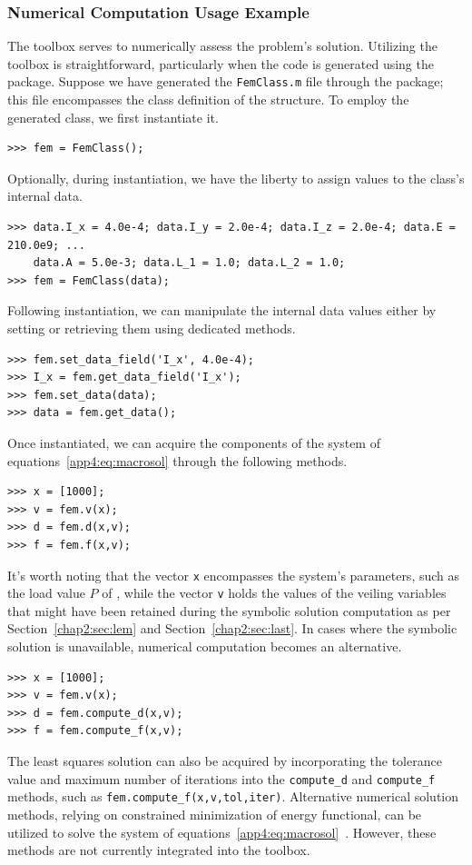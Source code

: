 \subsubsection{Numerical Computation Usage Example}

The \TrussMe{} \Matlab{} toolbox serves to numerically assess the problem's solution. Utilizing the toolbox is straightforward, particularly when the code is generated using the \TrussMe{} \Maple{} package. Suppose we have generated the \texttt{FemClass.m} file through the \TrussMe{} \Maple{} package; this file encompasses the class definition of the structure. To employ the generated class, we first instantiate it.
%
\begin{verbatim}
>>> fem = FemClass();
\end{verbatim}
%
Optionally, during instantiation, we have the liberty to assign values to the class's internal data.
%
\begin{verbatim}
>>> data.I_x = 4.0e-4; data.I_y = 2.0e-4; data.I_z = 2.0e-4; data.E = 210.0e9; ...
    data.A = 5.0e-3; data.L_1 = 1.0; data.L_2 = 1.0;
>>> fem = FemClass(data);
\end{verbatim}
%
Following instantiation, we can manipulate the internal data values either by setting or retrieving them using dedicated methods.
%
\begin{verbatim}
>>> fem.set_data_field('I_x', 4.0e-4);
>>> I_x = fem.get_data_field('I_x');
>>> fem.set_data(data);
>>> data = fem.get_data();
\end{verbatim}
%
Once instantiated, we can acquire the components of the system of equations~\eqref{app4:eq:macrosol} through the following methods.
%
\begin{verbatim}
>>> x = [1000];
>>> v = fem.v(x);
>>> d = fem.d(x,v);
>>> f = fem.f(x,v);
\end{verbatim}
%
It's worth noting that the vector \texttt{x} encompasses the system's parameters, such as the load value $P$ of , while the vector \texttt{v} holds the values of the veiling variables that might have been retained during the symbolic solution computation as per Section~\ref{chap2:sec:lem} and Section~\ref{chap2:sec:last}. In cases where the symbolic solution is unavailable, numerical computation becomes an alternative.
%
\begin{verbatim}
>>> x = [1000];
>>> v = fem.v(x);
>>> d = fem.compute_d(x,v);
>>> f = fem.compute_f(x,v);
\end{verbatim}
%
The least squares solution can also be acquired by incorporating the tolerance value and maximum number of iterations into the \texttt{compute\_d} and \texttt{compute\_f} methods, such as \texttt{fem.compute\_f(x,v,tol,iter)}. Alternative numerical solution methods, relying on constrained minimization of energy functional, can be utilized to solve the system of equations~\eqref{app4:eq:macrosol}~\cite{hutton2004fundamentals}. However, these methods are not currently integrated into the \TrussMe{} \Matlab{} toolbox.

